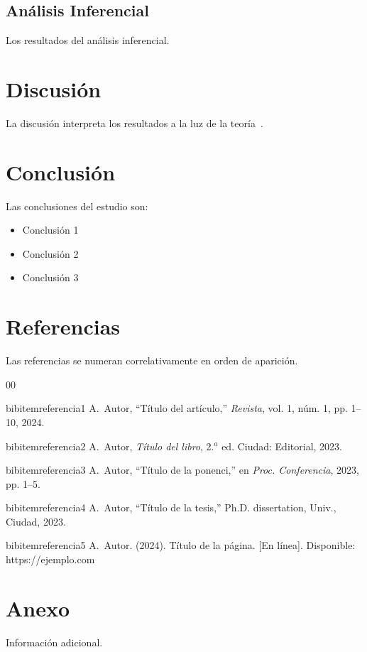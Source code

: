 \documentclass[conference, a4paper]{IEEEtran}
\begin{document}
\subsection{Análisis Inferencial}
Los resultados del análisis inferencial.

\section{Discusión}
\label{sec:discusion}
La discusión interpreta los resultados a la luz de la teoría~\cite{referencia3}.

\section{Conclusión}
\label{sec:conclusion}
Las conclusiones del estudio son:

\begin{itemize}
    \item Conclusión 1
    \item Conclusión 2
    \item Conclusión 3
\end{itemize}

\section{Referencias}
Las referencias se numeran correlativamente en orden de aparición.

\begin{thebibliography}{00}

bibitem{referencia1}
A.~Autor, ``Título del artículo,'' \emph{Revista}, vol. 1, núm. 1, pp. 1--10, 2024.

bibitem{referencia2}
A.~Autor, \emph{Título del libro}, 2.$^a$ ed. Ciudad: Editorial, 2023.

bibitem{referencia3}
A.~Autor, ``Título de la ponenci,'' en \emph{Proc. Conferencia}, 2023, pp. 1--5.

bibitem{referencia4}
A.~Autor, ``Título de la tesis,'' Ph.D. dissertation, Univ., Ciudad, 2023.

bibitem{referencia5}
A.~Autor. (2024). Título de la página. [En línea]. Disponible: https://ejemplo.com

\end{thebibliography}

\section{Anexo}
\label{anexo}
Información adicional.
\end{document}
